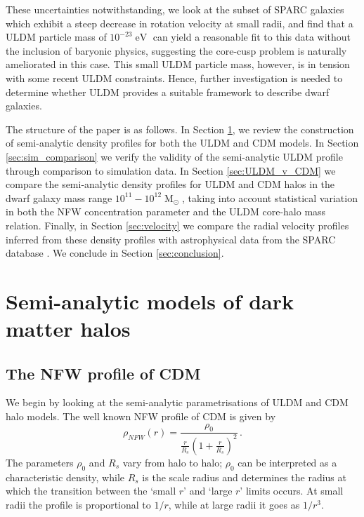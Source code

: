 \documentclass[a4paper,11pt]{article}
\begin{document}
These uncertainties notwithstanding, we look at the subset of SPARC galaxies which exhibit a steep decrease in rotation velocity at small radii, and find that a ULDM particle mass of $10^{-23}\operatorname{eV}$ can yield a reasonable fit to this data without the inclusion of baryonic physics, suggesting the core-cusp problem is naturally ameliorated in this case. This  small ULDM particle mass, however, is in tension with some recent ULDM constraints. Hence, further investigation is needed to determine whether ULDM provides a suitable framework to describe dwarf galaxies.  

The structure of the paper is as follows. In Section \ref{sec:models}, we review the construction of semi-analytic density profiles for both the ULDM and CDM models. In Section \ref{sec:sim_comparison} we  verify the validity of the semi-analytic ULDM profile  through comparison to simulation data. In Section \ref{sec:ULDM_v_CDM} we compare the semi-analytic density profiles for ULDM and CDM halos in the dwarf galaxy mass range $10^{11} - 10^{12}\operatorname{M}_{\odot}$, taking into account statistical variation in both the NFW concentration parameter and the ULDM core-halo mass relation. Finally, in Section \ref{sec:velocity} we compare the radial velocity profiles inferred from these density profiles with astrophysical data from the SPARC database \cite{Lelli:2016zqa}. We conclude in Section \ref{sec:conclusion}.

\clearpage





\section{Semi-analytic models of dark matter halos}\label{sec:models}


\subsection{The NFW profile of CDM}

We begin by looking at the semi-analytic parametrisations of ULDM and CDM halo models. The  well known  NFW   profile of CDM \cite{Navarro:1995iw, Maccio:2008pcd}  is given by
%
\begin{equation}\label{eq:nfw}
    \rho_{NFW}(r)=\frac{\rho_0}{\frac{r}{R_s}\left(1+\frac{r}{R_s}\right)^2} \, .
\end{equation}
%
The parameters $\rho_0$ and $R_s$ vary from halo to halo; $\rho_0$ can be interpreted as a characteristic density, while $R_s$ is the scale radius and determines the radius at which the transition between the `small $r$' and `large $r$' limits occurs. At small radii the profile is proportional to $1/r$, while at large radii it goes as $1/r^3$.
\end{document}
